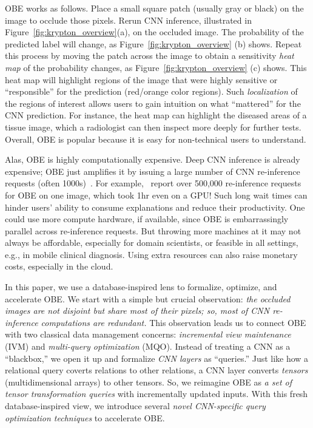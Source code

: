 OBE works as follows. Place a small square patch (usually gray or black) on the image to occlude those pixels. Rerun CNN inference, illustrated in Figure~\ref{fig:krypton_overview}(a), on the occluded image. The probability of the predicted label will change, as Figure~\ref{fig:krypton_overview} (b) shows. Repeat this process by moving the patch across the image to obtain a sensitivity \textit{heat map} of the probability changes, as Figure~\ref{fig:krypton_overview} (c) shows. This heat map will highlight regions of the image that were highly sensitive or ``responsible'' for the prediction (red/orange color regions). Such \textit{localization} of the regions of interest allows users to gain intuition on what ``mattered'' for the CNN prediction. For instance, the heat map can highlight the diseased areas of a tissue image, which a radiologist can then inspect more deeply for further tests. Overall, OBE is popular because it is easy for non-technical users to understand.

Alas, OBE is highly computationally expensive. Deep CNN inference is already expensive; OBE just amplifies it by issuing a large number of CNN re-inference requests (often 1000s)~\cite{ketkar2017introduction}. For example,~\cite{zintgraf2017visualizing} report over 500,000 re-inference requests for OBE on one image, which took 1hr even on a GPU! Such long wait times can hinder users' ability to consume explanations and reduce their productivity. One could use more compute hardware, if available, since OBE is embarrassingly parallel across re-inference requests. But throwing more machines at it may not always be affordable, especially for domain scientists, or feasible in all settings, e.g., in mobile clinical diagnosis. Using extra resources can also raise monetary costs, especially in the cloud.

In this paper, we use a database-inspired lens to formalize, optimize, and accelerate OBE. We start with a simple but crucial observation: \textit{the occluded images are not disjoint but share most of their pixels; so, most of CNN re-inference computations are redundant.} This observation leads us to connect OBE with two classical data management concerns: \textit{incremental view maintenance} (IVM) and \textit{multi-query optimization} (MQO). Instead of treating a CNN as a ``blackbox,'' we open it up and formalize \textit{CNN layers} as ``queries.'' Just like how a relational query coverts relations to other relations, a CNN layer converts \textit{tensors} (multidimensional arrays) to other tensors. So, we reimagine OBE as \textit{a set of tensor transformation queries} with incrementally updated inputs. With this fresh database-inspired view, we introduce several \textit{novel CNN-specific query optimization techniques} to accelerate OBE.

